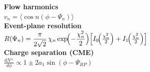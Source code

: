 \documentclass[border=1pt]{standalone}
\begin{document}
\begin{minipage}{7.2cm}
{\small\textbf{Flow harmonics}}\\[3pt]
$\displaystyle v_n = \bigl\langle \cos n(\phi - \Psi_n) \bigr\rangle$\\[5pt]
{\small\textbf{Event-plane resolution}}\\[3pt]
$\displaystyle R(\Psi_n) = \frac{\pi}{2\sqrt{2}}\,\chi_n \exp\!\Bigl(-\frac{\chi_n^2}{2}\Bigr)\Bigl[I_0\!\Bigl(\tfrac{\chi_n^2}{2}\Bigr) + I_1\!\Bigl(\tfrac{\chi_n^2}{2}\Bigr)\Bigr]$\\[5pt]
{\small\textbf{Charge separation (CME)}}\\[3pt]
$\displaystyle \frac{dN^{\pm}}{d\phi} \propto 1 \pm 2a_1\sin(\phi - \Psi_{RP})$
\end{minipage}
\end{document}
